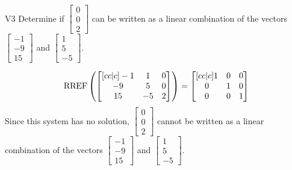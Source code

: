 \begin{problem}{V3}
Determine if  \(\begin{bmatrix} 0 \\ 0 \\ 2 \end{bmatrix}\) can be written as a linear combination of the vectors \(\begin{bmatrix} -1 \\ -9 \\ 15 \end{bmatrix}\) and \(\begin{bmatrix} 1 \\ 5 \\ -5 \end{bmatrix}\).
\end{problem}
\begin{solution}
\[\operatorname{RREF}\left(\begin{bmatrix}[cc|c] -1 & 1 & 0 \\ -9 & 5 & 0 \\ 15 & -5 & 2 \end{bmatrix} \right) = \begin{bmatrix}[cc|c] 1 & 0 & 0 \\ 0 & 1 & 0 \\ 0 & 0 & 1 \end{bmatrix}\]
Since this system has no solution, \(\begin{bmatrix} 0 \\ 0 \\ 2 \end{bmatrix}\) cannot be written as a linear combination of the vectors \(\begin{bmatrix} -1 \\ -9 \\ 15 \end{bmatrix}\) and \(\begin{bmatrix} 1 \\ 5 \\ -5 \end{bmatrix}\).

\end{solution}


